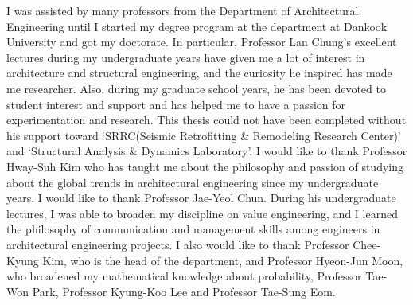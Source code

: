 I was assisted by many professors from the Department of Architectural Engineering until I started my degree program at the department at Dankook University and got my doctorate. In particular, Professor Lan Chung's excellent lectures during my undergraduate years have given me a lot of interest in architecture and structural engineering, and the curiosity he inspired has made me researcher. Also, during my graduate school years, he has been devoted to student interest and support and has helped me to have a passion for experimentation and research. This thesis could not have been completed without his support toward `SRRC(Seismic Retrofitting \& Remodeling Research Center)' and `Structural Analysis \& Dynamics Laboratory'. I would like to thank Professor Hway-Suh Kim who has taught me about the philosophy and passion of studying about the global trends in architectural engineering since my undergraduate years. I would like to thank Professor Jae-Yeol Chun. During his undergraduate lectures, I was able to broaden my discipline on value engineering, and I learned the philosophy of communication and management skills among engineers in architectural engineering projects. I also would like to thank Professor Chee-Kyung Kim, who is the head of the department, and Professor Hyeon-Jun Moon, who broadened my mathematical knowledge about probability, Professor Tae-Won Park, Professor Kyung-Koo Lee and Professor Tae-Sung Eom.


